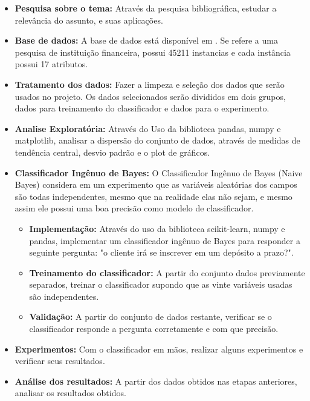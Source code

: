 \documentclass[conference]{IEEEtran}
\begin{document}
\begin{itemize}
\item \textbf{Pesquisa sobre o tema:}
Através da pesquisa bibliográfica, estudar  a relevância do assunto, e suas aplicações.
\item \textbf{Base de dados:}
A base de dados está disponível em \cite{b1}. Se refere a uma pesquisa de instituição financeira, possui 45211 instancias e cada instância possui 17 atributos.
\item \textbf{Tratamento dos dados:}
Fazer a limpeza e seleção dos dados que serão usados no projeto. Os dados selecionados serão divididos em dois grupos, dados para treinamento do classificador e dados para o experimento.
\item \textbf{Analise Exploratória:}
Através do Uso da biblioteca pandas, numpy e matplotlib, analisar a dispersão do conjunto de dados,
através de medidas de tendência central, desvio padrão e o plot de gráficos.

\item \textbf{Classificador Ingênuo de Bayes:}
	O Classificador Ingênuo de Bayes (Naive Bayes) considera em um experimento que as variáveis aleatórias dos campos são todas independentes, mesmo que na realidade elas não sejam, e mesmo assim ele possui uma boa precisão como modelo de classificador.
    \begin{itemize}
        \item \textbf{Implementação:}
        Através do uso da biblioteca scikit-learn, numpy e pandas, implementar um classificador ingênuo de Bayes
        para responder a seguinte pergunta: "o cliente irá se inscrever em um depósito a prazo?".
        \item \textbf{Treinamento do classificador:}
        A partir do conjunto dados previamente separados, treinar o classificador supondo que as vinte variáveis usadas são independentes.
        \item \textbf{Validação:}
        A partir do conjunto de dados restante, verificar se o classificador responde a pergunta corretamente e com que precisão.
    \end{itemize}
\item \textbf{Experimentos:}
Com o classificador em mãos, realizar alguns experimentos e verificar seus resultados.
\item \textbf{Análise dos resultados:}
A partir dos dados obtidos nas etapas anteriores, analisar os resultados obtidos.
\end{itemize}
\end{document}
